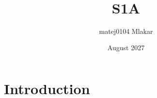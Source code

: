 \documentclass{article}
\title{S1A}
\author{matej0104 Mlakar}
\date{August 2027}
\begin{document}
\maketitle

\section{Introduction}
\end{document}
